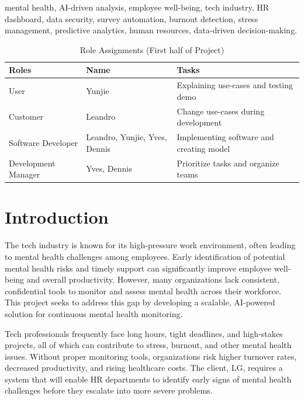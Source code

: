 \documentclass[conference]{IEEEtran}
\begin{document}
    \begin{IEEEkeywords}
        mental health, AI-driven analysis, employee well-being, tech 
        industry, HR dashboard, data security, survey automation, burnout 
        detection, stress management, predictive analytics, human resources,
         data-driven decision-making.
    \end{IEEEkeywords}
    
    
    \begin{table}[htbp]
        \caption{Role Assignments (First half of Project)}
        \centering
        \begin{tabular}{|p{1.8cm}|p{0.9cm}|p{4.8cm}|}
            \hline
            \textbf{Roles} & \textbf{Name} & \textbf{Tasks} \\ \hline
            User & Yunjie & Explaining use-cases and testing demo \\ \hline
            Customer & Leandro & Change use-cases during development \\ \hline
            Software Developer & Leandro, Yunjie, Yves, Dennis & Implementing software and creating model \\ \hline
            Development Manager & Yves, Dennis & Prioritize tasks and organize teams \\ \hline
        \end{tabular}
        \label{tab:role_assignments}
    \end{table}
    
    \section{Introduction}
    
        The tech industry is known for its high-pressure work environment, 
        often leading to mental health challenges among employees. 
        Early identification of potential mental health risks and timely 
        support can significantly improve employee well-being and overall 
        productivity. However, many organizations lack consistent, 
        confidential tools to monitor and assess mental health across their 
        workforce. This project seeks to address this gap by developing a 
        scalable, AI-powered solution for continuous mental health monitoring.
        
        Tech professionals frequently face long hours, tight
        deadlines, and high-stakes projects, all of which can
        contribute to stress, burnout, and other mental health issues.
        Without proper monitoring tools, organizations risk higher
        turnover rates, decreased productivity, and rising healthcare
        costs. The client, LG, requires a system that will enable HR
        departments to identify early signs of mental health challenges
        before they escalate into more severe problems.\newline
        
\end{document}
